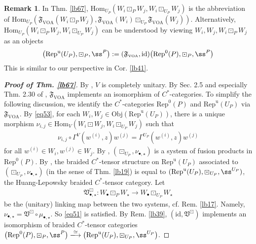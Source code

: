 \documentclass[11pt,b5paper,notitlepage]{article}
\theoremstyle{definition}
\newtheorem{rem}[df]{Remark}
\newtheorem{cv}[df]{Convention}
\theoremstyle{plain}
\newcommand{\fk}{\mathfrak}
\newcommand{\mc}{\mathcal}
\newcommand{\id}{\mathrm{id}}
\newcommand{\Hom}{\mathrm{Hom}}
\newcommand{\Rep}{\mathrm{Rep}}
\newcommand{\blt}{\bullet}
\newcommand{\Obj}{\mathrm{Obj}}
\newcommand{\VOA}{{\scriptscriptstyle \mathrm{VOA}}}
\newcommand{\RepUP}{\mathrm{Rep}^{\mathrm u}(U_P)}
\numberwithin{equation}{section}
\begin{document}
\begin{rem}
In Thm. \ref{lb67}, $\Hom_{U_P}(W_i\boxdot_P W_j, W_i\boxdot_{U_P}W_j)$ is the abbreviation of $\Hom_{U_P}(\fk F_\VOA(W_i\boxdot_P W_j), \fk F_\VOA(W_i)\boxdot_{U_P}\fk F_\VOA(W_j))$. Alternatively, $\Hom_{U_P}(W_i\boxdot_P W_j, W_i\boxdot_{U_P}W_j)$ can be understood by viewing $W_i,W_j,W_i\boxdot_P W_j$ as an objects 
\begin{align}
\big(\RepUP,\boxdot_P,\ss^P\big):=(\fk F_\VOA,\id)\big(\Rep^0(P),\boxdot_P,\ss^P \big)
\end{align}
This is similar to our perspective in Cor. \ref{lb41}.
\end{rem}





\begin{proof}[\textbf{Proof of Thm. \ref{lb67}}]
By \cite[Thm. 3.30]{Gui22}, $V$ is completely unitary. By Sec. 2.5 and especially Thm. 2.30 of \cite{Gui22}, $\fk F_\VOA$ implements an isomorphism of $C^*$-categories. To simplify the following discussion, we identify the $C^*$-categories $\Rep^0(P)$ and $\RepUP$ via $\fk F_\VOA$.  By \eqref{eq53}, for each $W_i,W_j\in\Obj(\RepUP)$, there is a unique morphism $\nu_{i,j}\in\Hom_V(W_i\boxdot W_j,W_i\boxdot_{U_P}W_j)$ such that
\begin{align*}
\nu_{i,j}\circ\Gamma^V(w^{(i)},z) w^{(j)}=\Gamma^{U_P}(w^{(i)},z)w^{(j)}
\end{align*}
for all $w^{(i)}\in W_i,w^{(j)}\in W_j$. By \cite[Thm. 3.29]{Gui22}, $(\boxdot_{U_P},\nu_{\blt,\star})$ is a system of fusion products in $\Rep^0(P)$. By \cite[Thm. 3.30]{Gui22}, the braided $C^*$-tensor structure on $\RepUP$ associated to $(\boxdot_{U_P},\nu_{\blt,\star})$ (in the sense of Thm. \ref{lb19}) is equal to $(\RepUP,\boxdot_{U_P},\ss^{U_P})$, the Huang-Lepowsky braided $C^*$-tensor category. Let
\begin{align*}
\fk V_{\blt,\star}^\boxdot:W_\blt\boxdot_P W_\star\rightarrow W_\blt\boxdot_{U_P}W_\star
\end{align*}
be the (unitary) linking map between the two systems, cf. Rem. \ref{lb17}. Namely, $\nu_{\blt,\star}=\fk V^\boxdot\circ\mu_{\blt,\star}$. So \eqref{eq51} is satisfied. By Rem. \ref{lb39}, $(\id,\fk V^\boxdot)$ implements an isomorphism of braided $C^*$-tensor categories $\big(\Rep^0(P),\boxdot_P,\ss^P \big)\xlongrightarrow{\simeq}\big(\RepUP,\boxdot_{U_P},\ss^{U_P}\big)$.
\end{proof}
\end{document}
